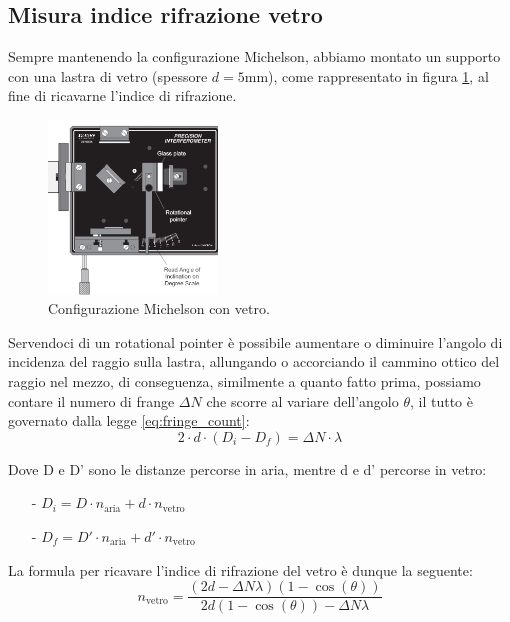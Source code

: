\documentclass[letterpaper,12pt]{article}
\begin{document}
\subsection{Misura indice rifrazione vetro}
Sempre mantenendo la configurazione Michelson, abbiamo montato un supporto con una lastra di vetro (spessore $d= 5\text{mm}$), come rappresentato in figura \ref{fig:michelson_vetro},
al fine di ricavarne l'indice di rifrazione.
\begin{figure}[h!]
    \centering
    \includegraphics[width=0.4\textwidth]{Michelson_vetro.png}
    \caption{Configurazione Michelson con vetro.}
    \label{fig:michelson_vetro}
\end{figure}

 Servendoci di un rotational pointer è possibile
aumentare o diminuire l'angolo di incidenza del raggio sulla lastra, allungando o accorciando il cammino ottico 
del raggio nel mezzo, di conseguenza, similmente a quanto fatto prima, possiamo contare il numero di frange $\Delta N$ che scorre 
al variare dell'angolo $\theta$, il tutto è governato dalla legge \eqref{eq:fringe_count}:
\begin{equation}
2 \cdot d \cdot (D_i - D_f) = \Delta N \cdot \lambda
\label{eq:fringe_count}
\end{equation}

Dove D e D' sono le distanze percorse in aria, mentre d e d' percorse in vetro:
\begin{itemize}
    \item[-] $D_i = D \cdot n_\text{aria} + d \cdot n_\text{vetro}$
    \item[-] $D_f = D' \cdot n_\text{aria} + d' \cdot n_\text{vetro}$
\end{itemize} 

La formula per ricavare l'indice di rifrazione del vetro è dunque la seguente:
\begin{equation}
    n_\text{vetro} = \frac{(2d -\Delta N \lambda)(1-\cos(\theta))}{2d (1-\cos(\theta)) - \Delta N \lambda}
    \label{eq:indice_rifrazione_vetro}
\end{equation}
\end{document}
